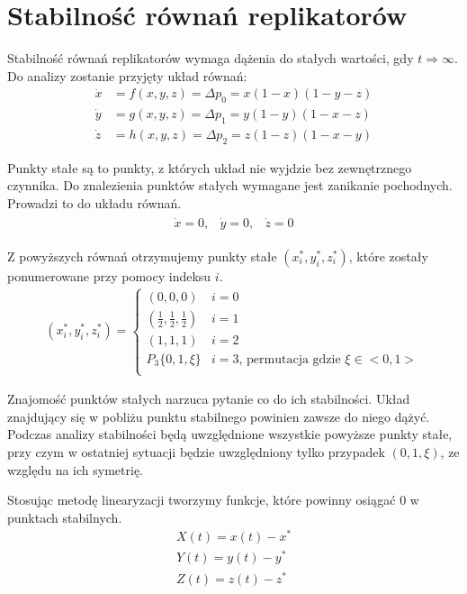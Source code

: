 \section{Stabilność równań replikatorów}
\label{sec:stab_repl}
Stabilność równań replikatorów \cite{Sss} wymaga dążenia do stałych wartości, gdy $t\Rightarrow \infty$. Do analizy zostanie przyjęty układ równań:
\begin{align}\label{eq:stab_uklad_analiza}
\dot{x} &= f(x,y,z) = \Delta p_0 = x(1-x)(1-y-z)\nonumber\\
\dot{y} &= g(x,y,z) = \Delta p_1 = y(1-y)(1-x-z)\\
\dot{z} &= h(x,y,z) = \Delta p_2 = z(1-z)(1-x-y)\nonumber
\end{align}

Punkty stałe są to punkty, z których układ nie wyjdzie bez zewnętrznego czynnika. Do znalezienia punktów stałych wymagane jest zanikanie pochodnych. Prowadzi to do układu równań.
\begin{align}
\begin{array}{ccc}
\dot{x} = 0, & \dot{y} = 0, & \dot{z} = 0
\end{array}
\end{align}

Z powyższych równań otrzymujemy punkty stałe $(x^*_i, y^*_i, z^*_i)$, które zostały ponumerowane przy pomocy indeksu $i$.
\begin{align}
(x^*_i, y^*_i, z^*_i) = \left\{
\begin{array}{ll}
(0,0,0)  & i=0 \\
(\frac{1}{2},\frac{1}{2},\frac{1}{2}) & i=1 \\
(1,1,1) & i=2 \\
P_3 \{0,1,\xi \} & i=3 \text{, permutacja gdzie }\xi \in <0,1>\\ 
\end{array}
\right.
\end{align}

Znajomość punktów stałych narzuca pytanie co do ich stabilności. Układ znajdujący się w pobliżu punktu stabilnego powinien zawsze do niego dążyć. Podczas analizy stabilności będą uwzględnione wszystkie powyższe punkty stałe, przy czym w ostatniej sytuacji będzie uwzględniony tylko przypadek $(0,1,\xi)$, ze względu na ich symetrię.

Stosując metodę linearyzacji tworzymy funkcje, które powinny osiągać 0 w punktach stabilnych.
\begin{align}\label{eq:nowe_f}
X(t)=x(t)-x^* \nonumber\\
Y(t)=y(t)-y^* \\
Z(t)=z(t)-z^* \nonumber
\end{align}

